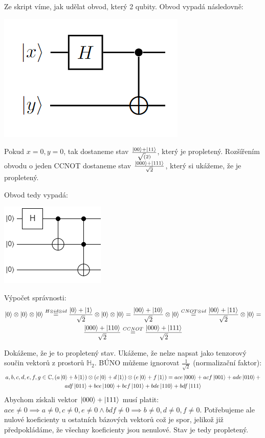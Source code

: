 \documentclass[12pt, a4paper]{article}
\begin{document}
\section{}
Ze skript víme, jak udělat obvod, který  2 qubity. Obvod vypadá následovně:
\begin{center}
\includegraphics{7/hint.png}
\end{center}
Pokud $x = 0, y = 0$, tak dostaneme stav $\frac{\ket{00} + \ket{11}}{\sqrt(2)}$, který je propletený. Rozšířením obvodu o jeden CCNOT dostaneme stav $\frac{\ket{000}+\ket{111}}{\sqrt{2}}$, který si ukážeme, že je propletený.

Obvod tedy vypadá:
\begin{center}
\includegraphics{7/circ.png}
\end{center}
Výpočet správnosti:
\begin{gather*}
\ket{0} \otimes \ket{0} \otimes \ket{0} \stackrel{H \otimes id \otimes id}{=} \frac{\ket{0}+\ket{1}}{\sqrt{2}} \otimes \ket{0} \otimes \ket{0} = \frac{\ket{00}+\ket{10}}{\sqrt{2}} \otimes \ket{0} \stackrel{CNOT \otimes id}{=} \frac{\ket{00}+\ket{11}}{\sqrt{2}} \otimes \ket{0} = \\
\frac{\ket{000}+\ket{110}}{\sqrt{2}} \stackrel{CCNOT}{=} \frac{\ket{000}+\ket{111}}{\sqrt{2}}
\end{gather*}

Dokážeme, že je to propletený stav. Ukážeme, že nelze napsat jako tenzorový součin vektorů z prostorů $\mathbb{H}_2$. BÚNO můžeme ignorovat $\frac{1}{\sqrt{2}}$ (normalizační faktor):
\begin{gather*}
a,b,c,d,e,f,g \in \mathbb{C}, (a\ket{0}+b\ket{1})\otimes(c\ket{0}+d\ket{1})\otimes(e\ket{0}+f\ket{1}) = ace\ket{000} + acf\ket{001} + ade\ket{010} + \\
adf\ket{011} + bce\ket{100} + bcf\ket{101} + bde\ket{110} + bdf\ket{111}
\end{gather*}
Abychom získali vektor $\ket{000}+\ket{111}$ musí platit: $ace \neq 0 \implies a\neq0, c\neq 0, e\neq 0 \land bdf \neq 0 \implies b\neq 0, d \neq 0, f \neq 0$. Potřebujeme ale nulové koeficienty u ostatních bázových vektorů což je spor, jelikož již předpokládáme, že všechny koeficienty jsou nenulové. Stav je tedy propletený.
\end{document}
